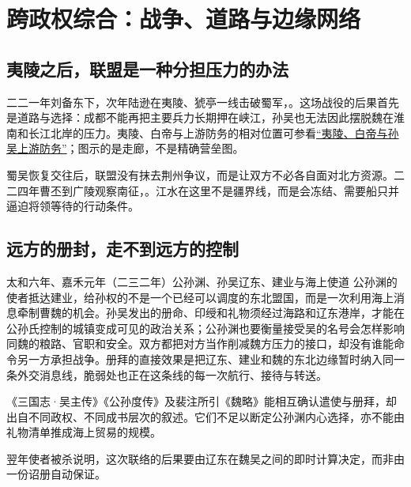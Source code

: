 \section{跨政权综合：战争、道路与边缘网络}
\label{sec:warfare-diplomacy}

\subsection{夷陵之后，联盟是一种分担压力的办法}

二二一年刘备东下，次年陆逊在夷陵、猇亭一线击破蜀军，。这场战役的后果首先是道路与选择：成都不能再把主要兵力长期押在峡江，孙吴也无法因此摆脱魏在淮南和长江北岸的压力。夷陵、白帝与上游防务的相对位置可参看\hyperref[fig:vol02b:yiling-river-defense]{“夷陵、白帝与孙吴上游防务”}；图示的是走廊，不是精确营垒图。

蜀吴恢复交往后，联盟没有抹去荆州争议，而是让双方不必各自面对北方资源。二二四年曹丕到广陵观察南征，。江水在这里不是疆界线，而是会冻结、需要船只并逼迫将领等待的行动条件。

\subsection{远方的册封，走不到远方的控制}

\begin{event}{}{太和六年、嘉禾元年（二三二年）}{公孙渊、孙吴}{辽东、建业与海上使道}
公孙渊的使者抵达建业，给孙权的不是一个已经可以调度的东北盟国，而是一次利用海上消息牵制曹魏的机会。孙吴发出的册命、印绶和礼物须经过海路和辽东港岸，才能在公孙氏控制的城镇变成可见的政治关系；公孙渊也要衡量接受吴的名号会怎样影响同魏的粮路、官职和安全。双方都把对方当作削减魏方压力的接口，却没有谁能命令另一方承担战争。册拜的直接效果是把辽东、建业和魏的东北边缘暂时纳入同一条外交消息线，脆弱处也正在这条线的每一次航行、接待与转送。

\begin{sourcenote}
《三国志·吴主传》《公孙度传》及裴注所引《魏略》能相互确认遣使与册拜，却出自不同政权、不同成书层次的叙述。它们不足以断定公孙渊内心选择，亦不能由礼物清单推成海上贸易的规模。
\end{sourcenote}
翌年使者被杀说明，这次联络的后果要由辽东在魏吴之间的即时计算决定，而非由一份诏册自动保证。
\end{event}


